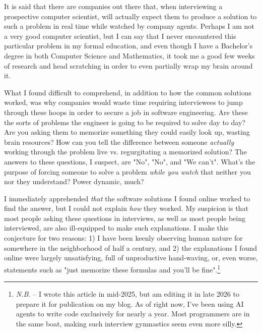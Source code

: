 It is said that there are companies out there that, when interviewing a prospective computer scientist, will actually expect them to produce a solution to such a problem in real time while watched by company agents.  Perhaps I am not a very good computer scientist, but I can say that I never encountered this particular problem in my formal education, and even though I have a Bachelor's degree in both Computer Science and Mathematics, it took me a good few weeks of research and head scratching in order to even partially wrap my brain around it.

What I found difficult to comprehend, in addition to how the common solutions worked, was why companies would waste time requiring interviewees to jump through these hoops in order to secure a job in software engineering.  Are these the sorts of problems the engineer is going to be required to solve day to day?  Are you asking them to memorize something they could easily look up, wasting brain resources?  How can you tell the difference between someone \textit{actually} working through the problem live vs. regurgitating a memorized solution?  The answers to these questions, I suspect, are "No", "No", and "We can't".  What's the purpose of forcing someone to solve a problem \textit{while you watch} that neither you nor they understand?  Power dynamic, much?

I immediately apprehended \textit{that} the software solutions I found online worked to find the answer, but I could not explain \textit{how} they worked.  My suspicion is that most people asking these questions in interviews, as well as most people being interviewed, are also ill-equipped to make such explanations.  I make this conjecture for two reasons: 1) I have been keenly observing human nature for somewhere in the neighborhood of half a century, and 2) the explanations I found online were largely unsatisfying, full of unproductive hand-waving, or, even worse, statements such as "just memorize these formulas and you'll be fine".\footnote{\textit{N.B.} -- I wrote this article in mid-2025, but am editing it in late 2026 to prepare it for publication on my blog.  As of right now, I've been using AI agents to write code exclusively for nearly a year.  Most programmers are in the same boat, making such interview gymnastics seem even more silly.}

\ifdefined\embedversion\newpage\fi
